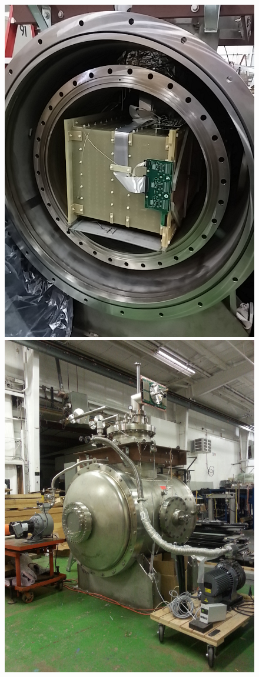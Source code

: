 \begin{figure}[htb]
\centering
\includegraphics[scale=0.18]{Chapter-2/Images/Cryostat1.jpg}
\includegraphics[scale=0.07]{Chapter-2/Images/Cryostat2.jpg}

\end{figure}
